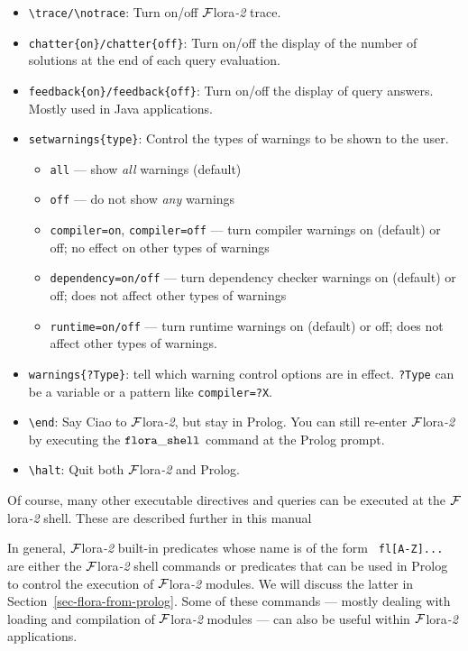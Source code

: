 \documentclass[11pt]{article}
\newcommand{\FLORA}{{\mbox{\sc ${\cal F}${lora}\rm\emph{-2}}}\xspace}
\newcommand{\FLSYSTEM}{\FLORA}
\newcommand{\FLSHELL}{flora\_shell}
\newcommand{\bs}{\textbackslash}
\begin{document}
\begin{itemize}
    Show solutions to subsequent queries one by one.
    \index{\bs{}trace}
    \index{\bs{}notrace}
\item {\tt \bs{}trace/\bs{}notrace}:
    Turn on/off \FLSYSTEM trace.
\item {\tt chatter\{on\}/chatter\{off\}}:
  Turn on/off the display of the number of solutions at the end of each query
  evaluation.
\item {\tt feedback\{on\}/feedback\{off\}}:
  Turn on/off the display of query answers. Mostly used in Java applications.
\item {\tt setwarnings\{type\}}:
  Control the types of warnings to be shown to the user.
  \begin{itemize}
  \item {\tt all} --- show \emph{all} warnings (default)
  \item {\tt off} --- do not show \emph{any}  warnings
  \item {\tt compiler=on}, \texttt{compiler=off}  --- turn compiler warnings on
    (default) or off; no effect on other types of warnings 
  \item  {\tt dependency=on/off} --- turn dependency
    checker warnings on (default) or off; does not affect other types of warnings
  \item  \texttt{runtime=on/off} --- turn runtime warnings on (default) or
    off; does not affect other types of warnings. 
  \end{itemize}
\item {\tt warnings\{?Type\}}: tell which warning control options are in effect.
  \texttt{?Type} can be a variable or a pattern like \texttt{compiler=?X}.  
\item {\tt \bs{}end}:
    Say Ciao to \FLSYSTEM, but stay in Prolog. You can still re-enter \FLSYSTEM
    by executing the $\tt \FLSHELL$ command at the Prolog prompt.
\item {\tt \bs{}halt}:
    Quit both \FLSYSTEM and Prolog.
\end{itemize}
Of course, many other executable directives and queries can be executed at
the \FLSYSTEM shell. These are described further in this manual

In general, \FLSYSTEM built-in predicates whose name is of the form {\tt
  fl[A-Z]...} are either the \FLSYSTEM shell commands or predicates that can
be used in Prolog to control the execution of \FLSYSTEM modules. We will
discuss the latter in Section~\ref{sec-flora-from-prolog}. Some of these
commands --- mostly dealing with loading and compilation of \FLSYSTEM modules
  --- can also be useful within \FLSYSTEM applications.
\end{document}

